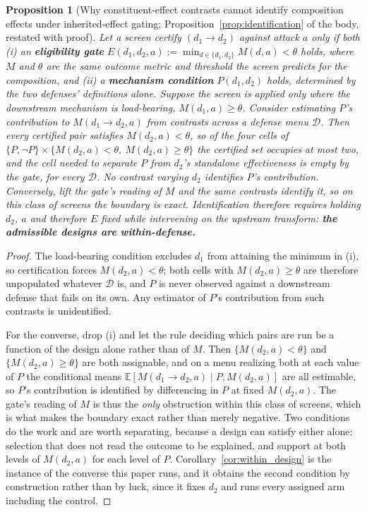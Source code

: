 \documentclass{article}
\newtheorem{proposition}[theorem]{Proposition}
\begin{document}
\begin{proposition}[Why constituent-effect contrasts cannot identify composition effects under inherited-effect gating; Proposition~\ref{prop:identification} of the body, restated with proof]
\label{prop:identification_full}
Let a screen certify $(d_1 \to d_2)$ against attack $a$ only if both
(i) an \textbf{eligibility gate} $E(d_1,d_2,a) := \min_{d \in \{d_1,d_2\}} M(d,a) < \theta$ holds, where $M$ and $\theta$ are the \emph{same} outcome metric and threshold the screen predicts for the composition, and
(ii) a \textbf{mechanism condition} $P(d_1,d_2)$ holds, determined by the two defenses' definitions alone.
Suppose the screen is applied only where the downstream mechanism is load-bearing, $M(d_1,a) \ge \theta$. Consider estimating $P$'s contribution to $M(d_1 \to d_2, a)$ from contrasts across a defense menu $\mathcal{D}$. Then every certified pair satisfies $M(d_2,a) < \theta$, so of the four cells of $\{P,\neg P\} \times \{M(d_2,a) < \theta,\ M(d_2,a) \ge \theta\}$ the certified set occupies at most two, and the cell needed to separate $P$ from $d_2$'s standalone effectiveness is empty by the gate, for every $\mathcal{D}$. No contrast varying $d_2$ identifies $P$'s contribution. Conversely, lift the gate's reading of $M$ and the same contrasts identify it, so on this class of screens the boundary is exact. Identification therefore requires holding $d_2$, $a$ and therefore $E$ fixed while intervening on the upstream transform: \textbf{the admissible designs are within-defense.}
\end{proposition}
\begin{proof}
The load-bearing condition excludes $d_1$ from attaining the minimum in (i), so certification forces $M(d_2,a) < \theta$; both cells with $M(d_2,a) \ge \theta$ are therefore unpopulated whatever $\mathcal{D}$ is, and $P$ is never observed against a downstream defense that fails on its own. Any estimator of $P$'s contribution from such contrasts is unidentified.

For the converse, drop (i) and let the rule deciding which pairs are run be a function of the design alone rather than of $M$. Then $\{M(d_2,a) < \theta\}$ and $\{M(d_2,a) \ge \theta\}$ are both assignable, and on a menu realizing both at each value of $P$ the conditional means $\mathbb{E}[M(d_1 \to d_2, a) \mid P, M(d_2,a)]$ are all estimable, so $P$'s contribution is identified by differencing in $P$ at fixed $M(d_2,a)$. The gate's reading of $M$ is thus the \emph{only} obstruction within this class of screens, which is what makes the boundary exact rather than merely negative. Two conditions do the work and are worth separating, because a design can satisfy either alone: selection that does not read the outcome to be explained, and support at both levels of $M(d_2,a)$ for each level of $P$. Corollary~\ref{cor:within_design} is the instance of the converse this paper runs, and it obtains the second condition by construction rather than by luck, since it fixes $d_2$ and runs every assigned arm including the control.
\end{proof}
\end{document}
